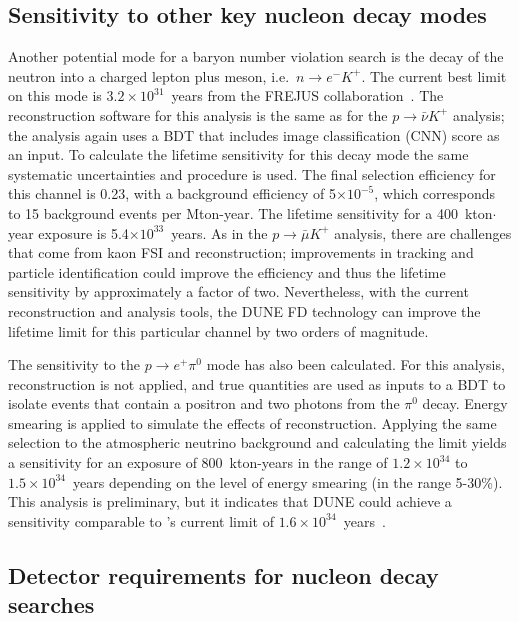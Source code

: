 \subsection{Sensitivity to other key nucleon decay modes}
\label{subsec:nonaccel-ndk-other}

Another potential mode for a baryon number violation search is the decay of the neutron into a charged lepton plus meson, i.e.~$n\rightarrow e^{-}K^{+}$. The current best limit on this mode is $3.2\times 10^{31}$~years from the FREJUS collaboration~\cite{Berger:1991fa}. The reconstruction software for this analysis is the same as for the $p\rightarrow \bar{\nu} K^{+} $ analysis; the analysis again uses a BDT that includes image classification (CNN) score as an input. To calculate the lifetime sensitivity for this decay mode the same systematic uncertainties and procedure is used. The final selection efficiency for this channel is 0.23, with a background efficiency of 5$\times 10^{-5}$, which corresponds to 15 background events per Mton-year. The lifetime sensitivity for a 400~kton$\cdot$year exposure is 5.4$\times 10^{33}$~years. As in the $p\rightarrow \bar{\mu}K^{+}$ analysis, there are challenges that come from kaon FSI and reconstruction; improvements in tracking and particle identification could improve the efficiency and thus the lifetime sensitivity by approximately a factor of two.  Nevertheless, with the current reconstruction and analysis tools, the DUNE FD technology can improve the lifetime limit for this particular channel by two orders of magnitude.

The sensitivity to the $p \rightarrow e^{+} \pi^0$ mode has also been calculated. For this analysis, reconstruction is not applied, and true quantities are used as inputs to a BDT to isolate events that contain a positron and two photons from the $\pi^0$ decay.  Energy smearing is applied to simulate the effects of reconstruction.  Applying the same selection to the atmospheric neutrino background and calculating the limit yields a sensitivity for an exposure of 800~kton-years in the range of $1.2 \times 10^{34}$ to $1.5 \times 10^{34}$~years depending on the level of energy smearing (in the range 5-30\%).  This analysis is preliminary, but it indicates that DUNE could achieve a sensitivity comparable to \superk's current limit of $1.6 \times 10^{34}$~years~\cite{Miura:2016krn}.

\subsection{Detector requirements for nucleon decay searches}
\label{subsec:nonaccel-ndk-requirements}

